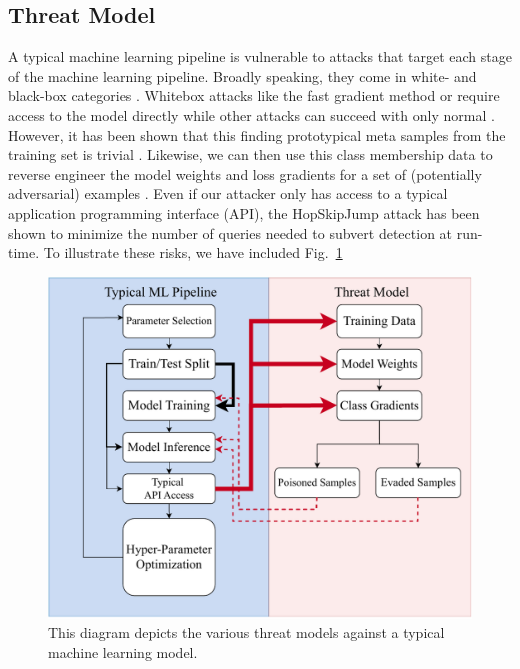 \documentclass[sigconf]{acmart}
\begin{document}
\subsection{Threat Model}
A typical machine learning pipeline is vulnerable to attacks that target each stage of the machine learning pipeline. Broadly speaking, they come in white- and black-box categories \cite{meyers}. Whitebox attacks like the fast gradient method \cite{fgm} or \cite{deepfool} require access to the model directly while other attacks can succeed with only normal . However, it has been shown that this finding prototypical meta samples from the training set is trivial \cite{}. Likewise, we can then use this class membership data to reverse engineer the model weights \cite{} and loss gradients for a set of (potentially adversarial) examples \cite{}. Even if our attacker only has access to a typical application programming interface (API), the HopSkipJump attack \cite{hopskipjump} has been shown to minimize the number of queries needed to subvert detection at run-time. To illustrate these risks, we have included Fig.~\ref{fig:threat_model}
\begin{figure}[h!]
    \centering
    \includegraphics[width=.6\textwidth]{images/attack_diagram.pdf}
    \caption{This diagram depicts the various threat models against a typical machine learning model.}
    \label{fig:threat_model}
\end{figure}
\label{threat}

\end{document}
